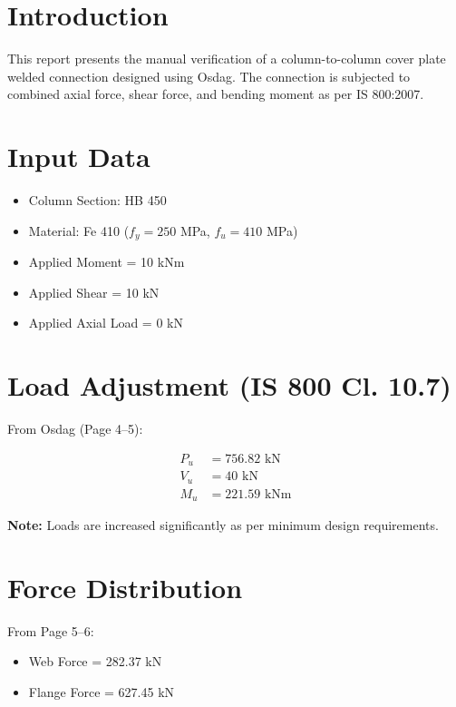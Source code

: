 

\maketitle

\section{Introduction}
This report presents the manual verification of a column-to-column cover plate welded connection designed using Osdag. The connection is subjected to combined axial force, shear force, and bending moment as per IS 800:2007.

\section{Input Data}
\begin{itemize}
    \item Column Section: HB 450
    \item Material: Fe 410 ($f_y = 250$ MPa, $f_u = 410$ MPa)
    \item Applied Moment = 10 kNm
    \item Applied Shear = 10 kN
    \item Applied Axial Load = 0 kN
\end{itemize}

\section{Load Adjustment (IS 800 Cl. 10.7)}

From Osdag (Page 4–5):

\begin{align}
P_u &= 756.82 \text{ kN} \\
V_u &= 40 \text{ kN} \\
M_u &= 221.59 \text{ kNm}
\end{align}

\textbf{Note:} Loads are increased significantly as per minimum design requirements.

\section{Force Distribution}

From Page 5–6:

\begin{itemize}
    \item Web Force = 282.37 kN
    \item Flange Force = 627.45 kN
\end{itemize}

